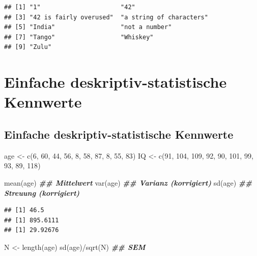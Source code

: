 \documentclass[
]{book}
\newenvironment{Shaded}{\begin{snugshade}}{\end{snugshade}}
\newcommand{\DecValTok}[1]{\textcolor[rgb]{0.00,0.00,0.81}{#1}}
\newcommand{\DocumentationTok}[1]{\textcolor[rgb]{0.56,0.35,0.01}{\textbf{\textit{#1}}}}
\newcommand{\FunctionTok}[1]{\textcolor[rgb]{0.00,0.00,0.00}{#1}}
\newcommand{\NormalTok}[1]{#1}
\newcommand{\OtherTok}[1]{\textcolor[rgb]{0.56,0.35,0.01}{#1}}
\newcommand{\SpecialCharTok}[1]{\textcolor[rgb]{0.00,0.00,0.00}{#1}}
\begin{document}
\begin{verbatim}
## [1] "1"                      "42"                    
## [3] "42 is fairly overused"  "a string of characters"
## [5] "India"                  "not a number"          
## [7] "Tango"                  "Whiskey"               
## [9] "Zulu"
\end{verbatim}

\hypertarget{einfache-deskriptiv-statistische-kennwerte}{%
\section{Einfache deskriptiv-statistische Kennwerte}\label{einfache-deskriptiv-statistische-kennwerte}}

\hypertarget{einfache-deskriptiv-statistische-kennwerte-1}{%
\subsection{Einfache deskriptiv-statistische Kennwerte}\label{einfache-deskriptiv-statistische-kennwerte-1}}

\begin{Shaded}
\begin{Highlighting}[]
\NormalTok{age }\OtherTok{\textless{}{-}} \FunctionTok{c}\NormalTok{(}\DecValTok{6}\NormalTok{, }\DecValTok{60}\NormalTok{, }\DecValTok{44}\NormalTok{, }\DecValTok{56}\NormalTok{, }\DecValTok{8}\NormalTok{, }\DecValTok{58}\NormalTok{, }\DecValTok{87}\NormalTok{, }\DecValTok{8}\NormalTok{, }\DecValTok{55}\NormalTok{, }\DecValTok{83}\NormalTok{)}
\NormalTok{IQ }\OtherTok{\textless{}{-}} \FunctionTok{c}\NormalTok{(}\DecValTok{91}\NormalTok{, }\DecValTok{104}\NormalTok{, }\DecValTok{109}\NormalTok{, }\DecValTok{92}\NormalTok{, }\DecValTok{90}\NormalTok{, }\DecValTok{101}\NormalTok{, }\DecValTok{99}\NormalTok{, }\DecValTok{93}\NormalTok{, }\DecValTok{89}\NormalTok{, }\DecValTok{118}\NormalTok{)}

\FunctionTok{mean}\NormalTok{(age)  }\DocumentationTok{\#\# Mittelwert}
\FunctionTok{var}\NormalTok{(age)  }\DocumentationTok{\#\# Varianz (korrigiert)}
\FunctionTok{sd}\NormalTok{(age) }\DocumentationTok{\#\# Streuung (korrigiert)}
\end{Highlighting}
\end{Shaded}

\begin{verbatim}
## [1] 46.5
## [1] 895.6111
## [1] 29.92676
\end{verbatim}

\begin{Shaded}
\begin{Highlighting}[]
\NormalTok{N }\OtherTok{\textless{}{-}} \FunctionTok{length}\NormalTok{(age)}
\FunctionTok{sd}\NormalTok{(age)}\SpecialCharTok{/}\FunctionTok{sqrt}\NormalTok{(N) }\DocumentationTok{\#\# SEM}
\end{Highlighting}
\end{Shaded}
\end{document}
